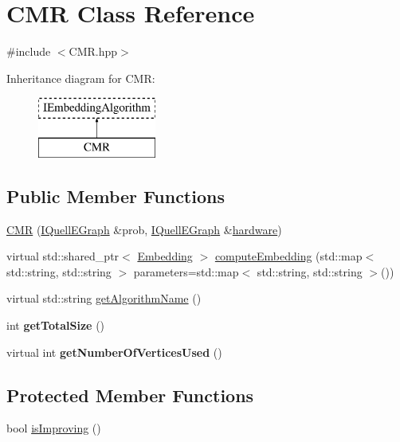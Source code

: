 \hypertarget{a00031}{}\section{C\+MR Class Reference}
\label{a00031}


{\ttfamily \#include $<$C\+M\+R.\+hpp$>$}

Inheritance diagram for C\+MR\+:\begin{figure}[H]
\begin{center}
\leavevmode
\includegraphics[height=2.000000cm]{a00031}
\end{center}
\end{figure}
\subsection*{Public Member Functions}
\begin{DoxyCompactItemize}
\item 
\hyperlink{a00031_aa3afc56561c2fc51701ee308991099db}{C\+MR} (\hyperlink{a00076}{I\+Quell\+E\+Graph} \&prob, \hyperlink{a00076}{I\+Quell\+E\+Graph} \&\hyperlink{a00071_aacf081e6ad5824b339b212844eb61b63}{hardware})
\item 
virtual std\+::shared\+\_\+ptr$<$ \hyperlink{a00050}{Embedding} $>$ \hyperlink{a00031_ae9f07427738d39c3f5f93e09c8178673}{compute\+Embedding} (std\+::map$<$ std\+::string, std\+::string $>$ parameters=std\+::map$<$ std\+::string, std\+::string $>$())
\item 
virtual std\+::string \hyperlink{a00031_a87e38fff11368b67d18671debcf1adcc}{get\+Algorithm\+Name} ()
\item 
int {\bfseries get\+Total\+Size} ()\hypertarget{a00031_a982fe78ed280508a0b615d468c114ae6}{}\label{a00031_a982fe78ed280508a0b615d468c114ae6}

\item 
virtual int {\bfseries get\+Number\+Of\+Vertices\+Used} ()\hypertarget{a00031_acfce8a8e0728c7b6561c819cb2fcf971}{}\label{a00031_acfce8a8e0728c7b6561c819cb2fcf971}

\end{DoxyCompactItemize}
\subsection*{Protected Member Functions}
\begin{DoxyCompactItemize}
\item 
bool \hyperlink{a00031_a0636b043d3167207f64dc555f536f087}{is\+Improving} ()
\end{DoxyCompactItemize}
